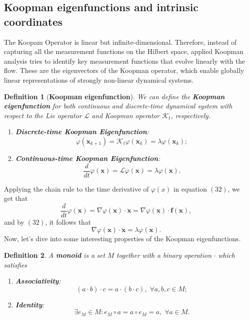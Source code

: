 \documentclass[]{article}
\newtheorem{definition}{Definition}
\begin{document}
\subsection{Koopman eigenfunctions and intrinsic coordinates}
The Koopam Operator is linear but infinite-dimensional. Therefore, instead of capturing all the measurement functions on the Hilbert space, applied Koopman analysis tries to identify key measurement functions that evolve linearly with the flow. These are the eigenvectors of the Koopman operator, which enable globally linear representations of strongly non-linear dynamical systems. 
\begin{definition}[\textbf{Koopman eigenfunction}]
We can define the \textbf{Koopman eigenfunction} for both continuous and discrete-time dynamical system with respect to the Lie operator $\mathcal{L}$ and Koopman operator $\mathcal{K}_{t}$, respectively.
\begin{enumerate}
	\item \textbf{Discrete-time Koopman Eigenfunction}:
	\begin{equation}
		\varphi(\textbf{x}_{k+1}) = \mathcal{K}_{t} \varphi(\textbf{x}_k) = \lambda \varphi(\textbf{x}_k);
	\end{equation}
	\item \textbf{Continuous-time Koopman Eigenfunction}:
	\begin{equation}
		\frac{d}{dt}\varphi(\textbf{x}) = \mathcal{L} \varphi(\textbf{x}) = \lambda \varphi(\textbf{x}).
	\end{equation}
\end{enumerate}
\end{definition}
Applying the chain rule to the time derivative of $\varphi(x)$ in equation $(32)$, we get that
\begin{equation}
	\frac{d}{dt}\varphi(\textbf{x}) = \nabla \varphi(\textbf{x}) \cdot \dot{\textbf{x}} = \nabla \varphi(\textbf{x}) \cdot \textbf{f}(\textbf{x}),
\end{equation}
and by $(32)$, it follows that
\begin{equation}
	\nabla \varphi(\textbf{x}) \cdot \dot{\textbf{x}} = \lambda \varphi(\textbf{x}).
\end{equation}
Now, let's dive into some interesting properties of the Koopman eigenfunctions.  
\begin{definition}
A \textbf{monoid} is a set $M$ together with a binary operation $\cdot$ which satisfies
\begin{enumerate}
	\item \textbf{Associativity}: \begin{equation}
		(a \cdot b) \cdot c = a \cdot (b \cdot c), \,\, \forall a,b,c \in M;
	\end{equation}
	\item \textbf{Identity}: \begin{equation}
		\exists e_M \in M: e_M \circ a = a \circ e_M = a, \,\, \forall a \in M.
	\end{equation}
\end{enumerate}
\end{definition}
\end{document}

